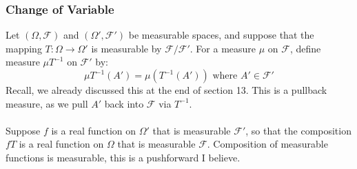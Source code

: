 \documentclass[12pt,a4paper]{article}
\newcommand{\1}[1]{\mathbbm{1}\left\{ #1 \right\}}
\newcommand{\fcal}{\mathcal{F}}
\begin{document}
\subsubsection{Change of Variable} Let $(\Omega, \fcal)$ and $(\Omega', \fcal')$ be measurable spaces, and suppose that the mapping $T: \Omega \to \Omega'$ is measurable by $\fcal/\fcal'$. For a measure $\mu$ on $\fcal$, define measure $\mu T^{-1}$ on $\fcal'$ by:
$$
	\mu T^{-1}(A') = \mu(T^{-1}(A')) \text{ where } A' \in \fcal'
$$
Recall, we already discussed this at the end of section 13. This is a pullback measure, as we pull $A'$ back into $\fcal$ via $T^{-1}$.
\\\\
Suppose $f$ is a real function on $\Omega'$ that is measurable $\fcal'$, so that the composition $fT$ is a real function on $\Omega$ that is measurable $\fcal$. Composition of measurable functions is measurable, this is a pushforward I believe. 
\end{document}
